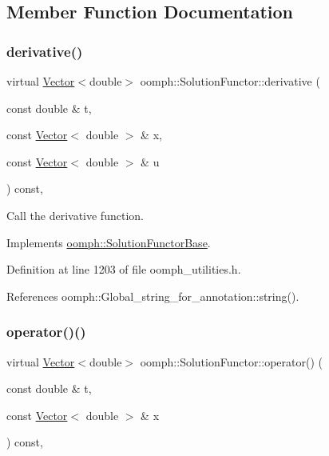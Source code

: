 \subsection{Member Function Documentation}
\mbox{\label{classoomph_1_1SolutionFunctor_a3e597c5cb36305a3a01471fadd03aee2}} 
\subsubsection{\texorpdfstring{derivative()}{derivative()}}
{\footnotesize\ttfamily virtual \hyperlink{classoomph_1_1Vector}{Vector}$<$double$>$ oomph\+::\+Solution\+Functor\+::derivative (\begin{DoxyParamCaption}\item[{const double \&}]{t,  }\item[{const \hyperlink{classoomph_1_1Vector}{Vector}$<$ double $>$ \&}]{x,  }\item[{const \hyperlink{classoomph_1_1Vector}{Vector}$<$ double $>$ \&}]{u }\end{DoxyParamCaption}) const\hspace{0.3cm}{\ttfamily [inline]}, {\ttfamily [virtual]}}



Call the derivative function. 



Implements \hyperlink{classoomph_1_1SolutionFunctorBase_aac070b0759ba6f040020972706ed4a9b}{oomph\+::\+Solution\+Functor\+Base}.



Definition at line 1203 of file oomph\+\_\+utilities.\+h.



References oomph\+::\+Global\+\_\+string\+\_\+for\+\_\+annotation\+::string().

\mbox{\label{classoomph_1_1SolutionFunctor_ae0428bc44f99335bd2b3d6f7203984d5}} 
\subsubsection{\texorpdfstring{operator()()}{operator()()}}
{\footnotesize\ttfamily virtual \hyperlink{classoomph_1_1Vector}{Vector}$<$double$>$ oomph\+::\+Solution\+Functor\+::operator() (\begin{DoxyParamCaption}\item[{const double \&}]{t,  }\item[{const \hyperlink{classoomph_1_1Vector}{Vector}$<$ double $>$ \&}]{x }\end{DoxyParamCaption}) const\hspace{0.3cm}{\ttfamily [inline]}, {\ttfamily [virtual]}}



